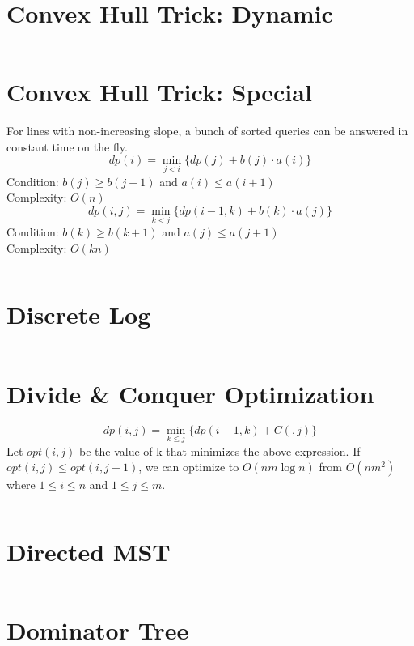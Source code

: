 \documentclass{article}
\begin{document}
\begin{multicols}{3}[
	\maketitle
    \begin{center}
        \rule{\textwidth}{2pt}
    \end{center}
]
\section{Convex Hull Trick: Dynamic}
\inputminted{cpp}{src/CHTDynamic.cc}

\section{Convex Hull Trick: Special}
For lines with non-increasing slope, a bunch of sorted queries can be answered in constant time on the fly.
\begin{equation*}
		dp(i) = \min\limits_{j<i} \{dp(j) + b(j) \cdot a(i)\}
\end{equation*}
Condition: $b(j) \geq b(j+1)$ and $a(i) \leq a(i+1)$ \\
Complexity: $O(n)$ \\
\begin{equation*}
		dp(i, j) = \min\limits_{k<j} \{dp(i-1, k) + b(k) \cdot a(j)\}
\end{equation*}
Condition: $b(k) \geq b(k+1)$ and $a(j) \leq a(j+1)$ \\
Complexity: $O(kn)$
\inputminted{cpp}{src/CHTLinear.cc}

\section{Discrete Log}
\inputminted{cpp}{src/DiscreteLog.cpp}

\section{Divide \& Conquer Optimization}
\begin{equation*}
		dp(i, j) = \min \limits_{k \leq j} \{ dp(i-1, k) + C(, j) \} 
\end{equation*}
Let $opt(i,j)$ be the value of k that minimizes the above expression. If $opt(i, j) \leq opt(i, j+1)$, we can optimize to $O(nm \log n)$ from $O(nm^2)$ where $1 \leq i \leq n$ and $1 \leq j \leq m$.
\inputminted{cpp}{src/DivideConquerDP.cc}

\section{Directed MST}
\inputminted{cpp}{src/DirectedMST.cc}

\section{Dominator Tree}
\inputminted{cpp}{src/DominatorTree.cc}


\end{multicols}
\end{document}
